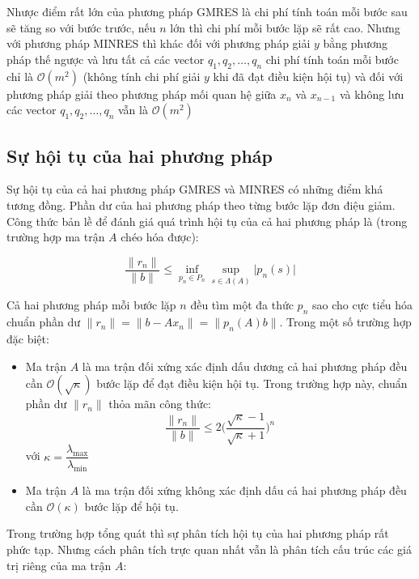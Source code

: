 \documentclass[14pt, a4paper]{article}
\numberwithin{equation}{section}
\numberwithin{algorithm}{section}
\numberwithin{figure}{section}
\numberwithin{dl}{section}
\numberwithin{md}{section}
\numberwithin{bd}{section}
\numberwithin{dn}{section}
\begin{document}
Nhược điểm rất lớn của phương pháp GMRES là chi phí tính toán mỗi bước sau sẽ tăng so với bước trước, nếu $n$ lớn thì chi phí mỗi bước lặp sẽ rất cao. Nhưng với phương pháp MINRES thì khác đối với phương pháp giải $y$ bằng phương pháp thế ngược và lưu tất cả các vector $q_1, q_2, \dots, q_n$ chi phí tính toán mỗi bước chỉ là $\mathcal{O}(m^2)$ (không tính chi phí giải $y$ khi đã đạt điều kiện hội tụ) và đối với phương pháp giải theo phương pháp mối quan hệ giữa $x_n$ và $x_{n-1}$ và không lưu các vector $q_1, q_2, \dots, q_n$ vẫn là $\mathcal{O}(m^2)$

\subsection{Sự hội tụ của hai phương pháp}

Sự hội tụ của cả hai phương pháp GMRES và MINRES có những điểm khá tương đồng. Phần dư của hai phương pháp theo từng bước lặp đơn điệu giảm. Công thức bản lề để đánh giá quá trình hội tụ của cả hai phương pháp là (trong trường hợp ma trận $A$ chéo hóa được):

\begin{equation}
    \dfrac{\lVert r_n \rVert}{\lVert b \rVert} \leq \inf_{p_n \in P_n} \sup_{s \in \Lambda(A)} \lvert p_n(s) \rvert
\end{equation}

Cả hai phương pháp mỗi bước lặp $n$ đều tìm một đa thức $p_n$ sao cho cực tiểu hóa chuẩn phần dư $\lVert r_n \rVert=\lVert b - Ax_n \rVert=\lVert p_n(A)b \rVert$. Trong một số trường hợp đặc biệt:

\begin{itemize}
    \item Ma trận $A$ là ma trận đối xứng xác định dấu dương cả hai phương pháp đều cần $\mathcal{O}(\sqrt{\kappa})$ bước lặp để đạt điều kiện hội tụ. Trong trường hợp này, chuẩn phần dư $\lVert r_n \lVert$ thỏa mãn công thức:
    \begin{equation}
        \dfrac{\lVert r_n \rVert }{\lVert b \rVert} \leq 2\Big(\dfrac{\sqrt{\kappa} - 1}{\sqrt{\kappa} + 1}\Big)^n
    \end{equation}
    với $\kappa=\dfrac{\lambda_{\max}}{\lambda_{\min}}$
    \item Ma trận $A$ là ma trận đối xứng không xác định dấu cả hai phương pháp đều cần $\mathcal{O}(\kappa)$ bước lặp để hội tụ.
\end{itemize}

Trong trường hợp tổng quát thì sự phân tích hội tụ của hai phương pháp rất phức tạp. Nhưng cách phân tích trực quan nhất vẫn là phân tích cấu trúc các giá trị riêng của ma trận $A$:
\end{document}
